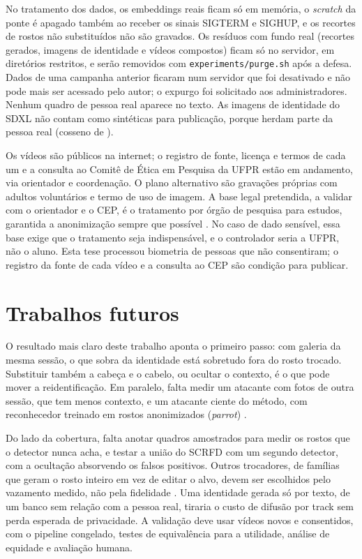 No tratamento dos dados, os embeddings reais ficam só em memória, o \emph{scratch} da ponte é apagado também ao receber os sinais SIGTERM e SIGHUP, e os recortes de rostos não substituídos não são gravados. Os resíduos com fundo real (recortes gerados, imagens de identidade e vídeos compostos) ficam só no servidor, em diretórios restritos, e serão removidos com \texttt{experiments/purge.sh} após a defesa. Dados de uma campanha anterior ficaram num servidor que foi desativado e não pode mais ser acessado pelo autor; o expurgo foi solicitado aos administradores. Nenhum quadro de pessoa real aparece no texto. As imagens de identidade do SDXL não contam como sintéticas para publicação, porque herdam parte da pessoa real (cosseno de ).

Os vídeos são públicos na internet; o registro de fonte, licença e termos de cada um e a consulta ao Comitê de Ética em Pesquisa da UFPR estão em andamento, via orientador e coordenação. O plano alternativo são gravações próprias com adultos voluntários e termo de uso de imagem. A base legal pretendida, a validar com o orientador e o CEP, é o tratamento por órgão de pesquisa para estudos, garantida a anonimização sempre que possível \citep[art.~7º, IV; art.~11, II, c]{lgpd}. No caso de dado sensível, essa base exige que o tratamento seja indispensável, e o controlador seria a UFPR, não o aluno. Esta tese processou biometria de pessoas que não consentiram; o registro da fonte de cada vídeo e a consulta ao CEP são condição para publicar.

\section{Trabalhos futuros}

O resultado mais claro deste trabalho aponta o primeiro passo: com galeria da mesma sessão, o que sobra da identidade está sobretudo fora do rosto trocado. Substituir também a cabeça e o cabelo, ou ocultar o contexto, é o que pode mover a reidentificação. Em paralelo, falta medir um atacante com fotos de outra sessão, que tem menos contexto, e um atacante ciente do método, com reconhecedor treinado em rostos anonimizados (\emph{parrot}) \citep{hanisch}.

Do lado da cobertura, falta anotar quadros amostrados para medir os rostos que o detector nunca acha, e testar a união do SCRFD com um segundo detector, com a ocultação absorvendo os falsos positivos. Outros trocadores, de famílias que geram o rosto inteiro em vez de editar o alvo, devem ser escolhidos pelo vazamento medido, não pela fidelidade \citep{mustu}. Uma identidade gerada só por texto, de um banco sem relação com a pessoa real, tiraria o custo de difusão por track sem perda esperada de privacidade. A validação deve usar vídeos novos e consentidos, com o pipeline congelado, testes de equivalência para a utilidade, análise de equidade e avaliação humana.


